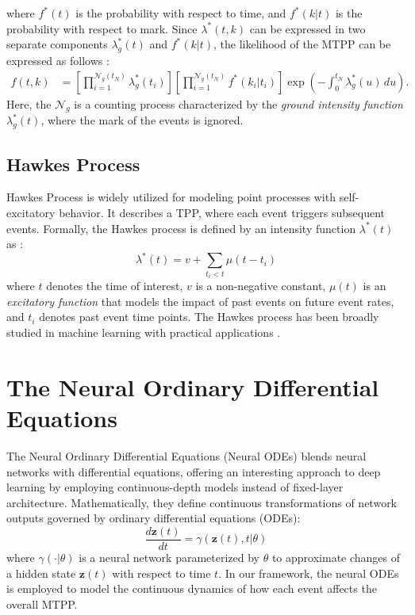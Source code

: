 where $f^*(t)$ is the probability 
with respect to time, and $f^*(k|t)$ is the probability with respect to mark.
Since $\lambda^*(t,k)$ can be expressed in two separate components $\lambda_g^*(t)$ and $f^*(k|t)$, the likelihood of the MTPP can be expressed as follows \cite{bib:daley}:
\begin{align}
f(t, k) 
&= \left[\prod_{i=1}^{\mathcal{N}_g(t_N)} \lambda_g^*(t_i)\right] \left[\prod_{i=1}^{\mathcal{N}_g(t_N)} f^*(k_i | t_i)\right] \exp\left(-\int_0^{t_N} \lambda_g^*(u) \, du\right).
\label{eq:likelihood}
\end{align}
Here, the $\mathcal{N}_g$ is a counting process
characterized by the \textit{ground intensity function} $\lambda ^* _g(t)$, where the mark of the events is ignored. 

\subsection{Hawkes Process}
Hawkes Process \label{bg: hp} is widely utilized for modeling point processes with self-excitatory behavior. 
It describes a TPP, where each event triggers subsequent events. 
Formally, the Hawkes process is defined by an intensity function $\lambda^*(t)$ as \cite{bib:hawkes}:
\begin{equation}
\lambda^*(t) = v + \sum_{t_i < t} \mu(t - t_i)    
\end{equation}
where $t$ denotes the time of interest, $v$ is a non-negative constant, $\mu(t)$ is an \textit{excitatory function} that models the impact of past events on future event rates, and $t_i$ denotes past event time points. 
The Hawkes process has been broadly studied in machine learning \cite{bib:ANHP, bib:nhp, bib:THP, bib:sahp} with 
practical applications \cite{hawkesInFinance, bib:onlineInteraction, bib:hawkesDocuments}.  

\section{The Neural Ordinary Differential Equations}
The Neural Ordinary Differential Equations (Neural ODEs) blends neural networks with differential equations, offering an interesting approach to deep learning \cite{bib:node} by employing continuous-depth models instead of fixed-layer architecture. 
Mathematically, they define continuous transformations of network outputs governed by ordinary differential equations (ODEs):
\begin{equation}
\frac{{d\mathbf{z}(t)}}{{dt}} = \gamma(\mathbf{z}(t), t| \theta)
\end{equation}
where $\gamma(\cdot|\theta)$ is a neural network parameterized by $\theta$ to approximate changes of a hidden state $\mathbf{z}(t)$ with respect to time $t$. In our framework, the neural ODEs is employed to model the continuous dynamics of how each event affects the overall MTPP.
